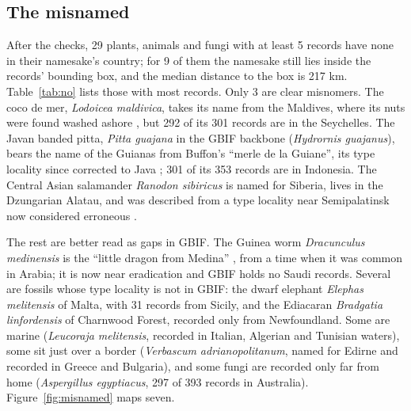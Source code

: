 \documentclass[11pt,a4paper]{article}
\begin{document}
\subsection{The misnamed}
After the checks, 29 plants, animals and fungi with at least 5 records have none in their namesake's country; for 9 of them the namesake still lies inside the records' bounding box, and the median distance to the box is 217 km. Table~\ref{tab:no} lists those with most records. Only 3 are clear misnomers. The coco de mer, \textit{Lodoicea maldivica}, takes its name from the Maldives, where its nuts were found washed ashore \citep{capasia}, but 292 of its 301 records are in the Seychelles. The Javan banded pitta, \textit{Pitta guajana} in the GBIF backbone (\textit{Hydrornis guajanus}), bears the name of the Guianas from Buffon's ``merle de la Guiane'', its type locality since corrected to Java \citep{ioc}; 301 of its 353 records are in Indonesia. The Central Asian salamander \textit{Ranodon sibiricus} is named for Siberia, lives in the Dzungarian Alatau, and was described from a type locality near Semipalatinsk now considered erroneous \citep{frost}.

The rest are better read as gaps in GBIF. The Guinea worm \textit{Dracunculus medinensis} is the ``little dragon from Medina'' \citep{eid2016}, from a time when it was common in Arabia; it is now near eradication and GBIF holds no Saudi records. Several are fossils whose type locality is not in GBIF: the dwarf elephant \textit{Elephas melitensis} of Malta, with 31 records from Sicily, and the Ediacaran \textit{Bradgatia linfordensis} of Charnwood Forest, recorded only from Newfoundland. Some are marine (\textit{Leucoraja melitensis}, recorded in Italian, Algerian and Tunisian waters), some sit just over a border (\textit{Verbascum adrianopolitanum}, named for Edirne and recorded in Greece and Bulgaria), and some fungi are recorded only far from home (\textit{Aspergillus egyptiacus}, 297 of 393 records in Australia). Figure~\ref{fig:misnamed} maps seven.
\end{document}
